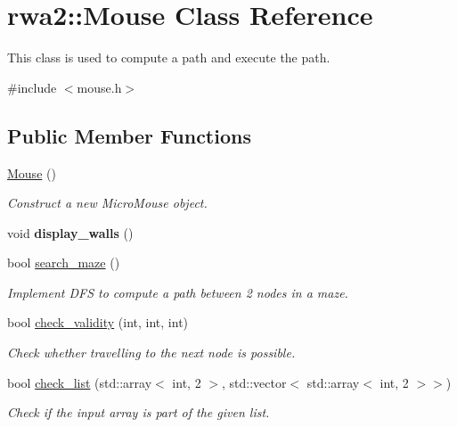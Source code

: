 \hypertarget{classrwa2_1_1_mouse}{}\section{rwa2\+:\+:Mouse Class Reference}
\label{classrwa2_1_1_mouse}


This class is used to compute a path and execute the path.  




{\ttfamily \#include $<$mouse.\+h$>$}

\subsection*{Public Member Functions}
\begin{DoxyCompactItemize}
\item 
\hyperlink{classrwa2_1_1_mouse_a048dffae3aaa3a6ddc2c6cc4741a097c}{Mouse} ()
\begin{DoxyCompactList}\small\item\em Construct a new Micro\+Mouse object. \end{DoxyCompactList}\item 
\mbox{\label{classrwa2_1_1_mouse_abbcc99c41fd073426fdfd790f947956e}} 
void {\bfseries display\+\_\+walls} ()
\item 
bool \hyperlink{classrwa2_1_1_mouse_a789be287a432bafc903c97396a014d7d}{search\+\_\+maze} ()
\begin{DoxyCompactList}\small\item\em Implement D\+FS to compute a path between 2 nodes in a maze. \end{DoxyCompactList}\item 
bool \hyperlink{classrwa2_1_1_mouse_a35873f1fd775399f6506a1da415a8da9}{check\+\_\+validity} (int, int, int)
\begin{DoxyCompactList}\small\item\em Check whether travelling to the next node is possible. \end{DoxyCompactList}\item 
bool \hyperlink{classrwa2_1_1_mouse_a760964c393cf8861429d2e02aba4f033}{check\+\_\+list} (std\+::array$<$ int, 2 $>$, std\+::vector$<$ std\+::array$<$ int, 2 $>$$>$)
\begin{DoxyCompactList}\small\item\em Check if the input array is part of the given list. \end{DoxyCompactList}\item 
$$
\end{DoxyCompactItemize}
